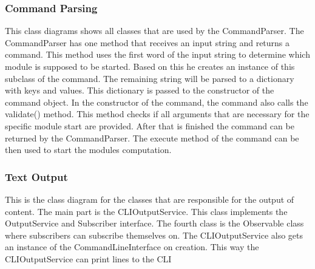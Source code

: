 \documentclass[parskip=full]{scrartcl}
\begin{document}
\subsubsection{Command Parsing}

\begin{figure}[h]
\begin{center}

\label{Command Parsing}
\end{center}
\end{figure}
\newpage

This class diagrams shows all classes that are used by the CommandParser.
The CommandParser has one method that receives an input string and returns a command.
This method uses the first word of the input string to determine which module is supposed to be started.
Based on this he creates an instance of this subclass of the command.
The remaining string will be parsed to a dictionary with keys and values.
This dictionary is passed to the constructor of the command object.
In the constructor of the command, the command also calls the validate() method.
This method checks if all arguments that are necessary for the specific module start are provided.
After that is finished the command can be returned by the CommandParser.
The execute method of the command can be then used to start the modules computation.

\newpage

\subsubsection{Text Output}

\begin{figure}[h]
\begin{center}

\label{Command Parsing}
\end{center}
\end{figure}
\newpage

This is the class diagram for the classes that are responsible for the output of content.
The main part is the CLIOutputService. 
This class implements the OutputService and Subscriber interface.
The fourth class is the Observable class where subscribers can subscribe themselves on.
The CLIOutputService also gets an instance of the CommandLineInterface on creation.
This way the CLIOutputService can print lines to the \gls{CLI}
\end{document}
